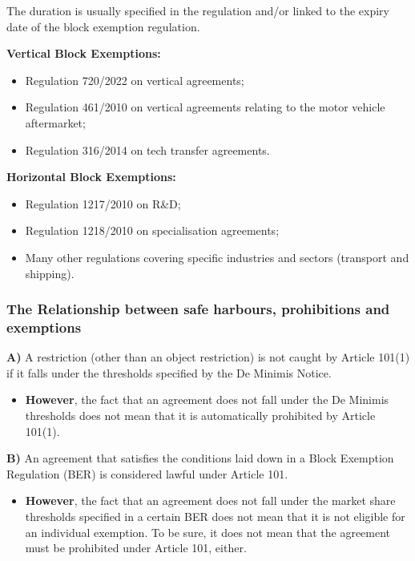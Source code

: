         The duration is usually specified in the regulation and/or linked to the expiry date of the block exemption regulation.
        
        \textbf{Vertical Block Exemptions:}
        \begin{itemize}
            \item Regulation 720/2022 on vertical agreements;
            \item Regulation 461/2010 on vertical agreements relating to the motor vehicle aftermarket;
            \item Regulation 316/2014 on tech transfer agreements.
        \end{itemize}
        
        \textbf{Horizontal Block Exemptions:}
        \begin{itemize}
            \item Regulation 1217/2010 on R\&D;
            \item Regulation 1218/2010 on specialisation agreements;
            \item Many other regulations covering specific industries and sectors (transport and shipping).
        \end{itemize}

\newpage
        \subsubsection{The Relationship between safe harbours, prohibitions and exemptions}

            \textbf{A)} A restriction (other than an object restriction) is not caught by Article 101(1) if it falls under the thresholds specified by the De Minimis Notice.
            \begin{itemize}
                \item \textbf{However}, the fact that an agreement does not fall under the De Minimis thresholds does not mean that it is automatically prohibited by Article 101(1).
            \end{itemize}

            \noindent
            \textbf{B)} An agreement that satisfies the conditions laid down in a Block Exemption Regulation (BER) is considered lawful under Article 101.
            \begin{itemize}
                \item \textbf{However}, the fact that an agreement does not fall under the market share thresholds specified in a certain BER does not mean that it is not eligible for an individual exemption. To be sure, it does not mean that the agreement must be prohibited under Article 101, either.
            \end{itemize}
            
